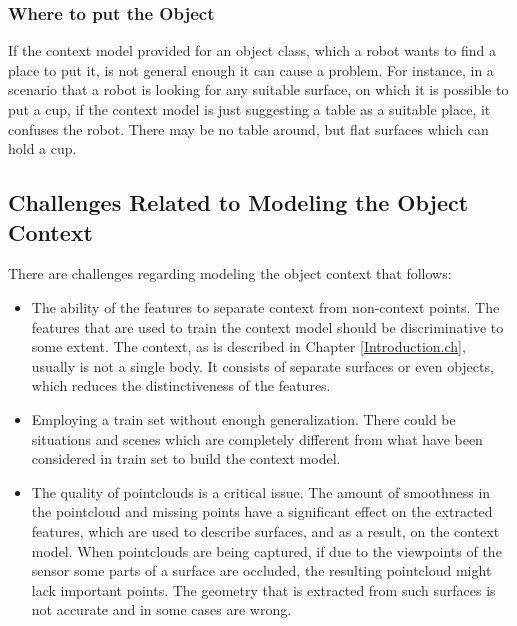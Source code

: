 \subsubsection{Where to put the Object}
\label{wheretoputtheobject.ssec}
If the context model provided for an object class, which a robot wants to find a place to put it, is not general enough
it can cause a problem. For instance, in a scenario that a robot is looking for any suitable surface, on which it is possible 
to put a cup, if the context model is just suggesting a table as a suitable place, it confuses the robot. 
There may be no table around, but flat surfaces which can hold a cup.

\subsection{Challenges Related to Modeling the Object Context}

There are challenges regarding modeling the object context that follows:

\begin{itemize}
 \item The ability of the features to separate context from non-context points. The features that are used to train the context model
   should be discriminative to some extent. The context, as is described in Chapter \ref{Introduction.ch}, usually is not a single
   body. It consists of separate surfaces or even objects, which reduces the distinctiveness of the features.  
   
 \item Employing a train set without enough generalization. There could be situations and scenes which are completely different from
	what have been considered in train set to build the context model.
	
 \item The quality of pointclouds is a critical issue. The amount of smoothness in the pointcloud and missing points have a 
 significant effect on the extracted features, which are used to describe surfaces, and as a result, on the context model. 
 When pointclouds are being captured, if due to the viewpoints of the sensor some parts of a surface are occluded, 
 the resulting pointcloud might lack important points.
 The geometry that is extracted from such surfaces is not accurate and in some cases are wrong.
 
\end{itemize}

